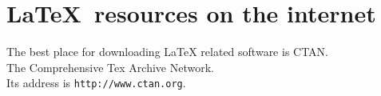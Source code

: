 \documentclass{article}
\begin{document}
\section{\textsf{\LaTeX\ resources on the internet}}
The best place for downloading LaTeX related software is CTAN.\\
The Comprehensive Tex Archive Network.\\
Its address is \texttt{http://www.ctan.org}.
\end{document}
